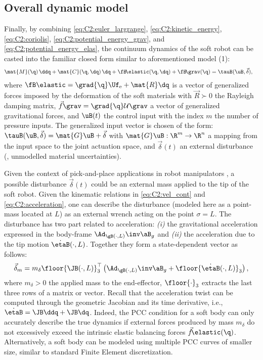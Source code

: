 \subsection{Overall dynamic model}
\noindent Finally, by combining \eqref{eq:C2:euler_largrange}, \eqref{eq:C2:kinetic_energy}, \eqref{eq:C2:coriolis}, \eqref{eq:C2:potential_energy_grav}, and \eqref{eq:C2:potential_energy_elas}, the continuum dynamics of the soft robot can be casted into the familiar closed form
\cite{DellaSantina2020,Boyer2021,Renda2018} similar to aforementioned model (1):
%
\begin{align}
\mat{M}(\q)\,\ddq + \mat{C}(\q,\dq)\,\dq + \fB\!\elastic(\q,\dq) + \fB\!\grav(\q) & = \tauB(\uB,\vec{\delta}),
\label{eq:C2:dynamic_model}
\end{align}
%
where $\fB\elastic = \grad{\q}\Uf_{\textrm{e}} + \mat{R}\dq$ is a vector of generalized forces imposed by the deformation of the soft materials with $\vec{R} \succ 0$ the Rayleigh damping matrix,
$\vec{f}\grav = \grad{\q} \mathcal{U}\grav$ a vector of generalized gravitational forces, and
$\uB(t)$ the control input with the index
$m$ the number of pressure inputs. The generalized input vector is chosen of the form:
$\tauB(\uB,\vec{\delta}) = \mat{G}\uB + \vec{\delta}$ with $\mat{G} \uB: \R^m \to \R^n$ a mapping from the input space to the joint actuation space, and $\vec{\delta}(t)$ an external disturbance (\eg, unmodelled material uncertainties).
%
\begin{rmk}
Given the context of \editl pick-and-place applications in robot manipulators \editr, a possible disturbance $\vec{\delta}(t)$ could be an external mass applied to the tip of the soft robot. \editl Given the kinematic relations in \eqref{eq:C2:vel_cont} and \eqref{eq:C2:acceleration}, one can describe the disturbance (modeled here as a point-mass located at $L$) as an external wrench acting on the point $\sigma = L$. The disturbance has two part related to acceleration: \textit{(i)} the gravitational acceleration expressed in the body-frame ${\normalfont \Ad}_{\gB(\cdot,L)}\inv \aB_g$ and \textit{(ii)} the acceleration due to the tip motion $\dot{\etaB}(\cdot,L)$. Together they form a state-dependent vector as follows: \editr
%
\begin{equation}
\vec{\delta}_m = m_\delta \floor{\JB(\cdot,L)}_3^\top\left({\normalfont \Ad}_{\gB(\cdot,L)}\inv \aB_g + \floor{\dot{\etaB}(\cdot,L)}_3 \right),
\label{eq:C2:delta_payload}
\end{equation}
%
where $m_\delta > 0$ the applied mass to the end-effector, $\floor{\cdot}_3$ extracts the last three rows of a matrix or vector. Recall that the acceleration twist can be computed through the geometric Jacobian and its time derivative, i.e., $\dot{\etaB} = \JB\ddq + \JB\dq$. Indeed, the PCC condition for a soft body can only accurately describe the true dynamics if external forces produced by mass $m_\delta$ do not excessively exceed the intrinsic elastic balancing forces $\vec{f}\!\elastic(\q)$. Alternatively, a soft body can be modeled using multiple PCC curves of smaller size, similar to standard Finite Element discretization.
\end{rmk}

